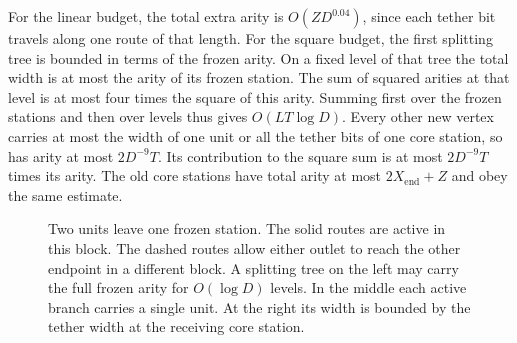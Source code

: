 For the linear budget, the total extra arity is $O(ZD^{0.04})$, since each tether bit travels
along one route of that length. For the square budget, the first splitting tree is bounded in terms of the frozen arity. On a fixed level of that tree
the total width is at most the arity of its frozen station. The
sum of squared arities at that level is at most four times the square
of this arity. Summing first over the frozen stations and then over
levels thus gives $O(LT\log D)$. Every other new vertex carries at
most the width of one unit or all the tether bits of one core station,
so has arity at most $2D^{-9}T$. Its contribution to the square sum
is at most $2D^{-9}T$ times its arity. The old core stations have
total arity at most $2X_{\mathrm{end}}+Z$ and obey the same estimate.

\begin{figure}[tb]
\centering
{}
\caption{Two units leave one frozen station. The solid routes are
active in this block. The dashed routes allow either outlet to reach the
other endpoint in a different block. A splitting tree on the left may
carry the full frozen arity for $O(\log D)$ levels. In the middle each
active branch carries a single unit. At the right its width is bounded
by the tether width at the receiving core station.}
\label{fig:tether-trees}
\end{figure}

